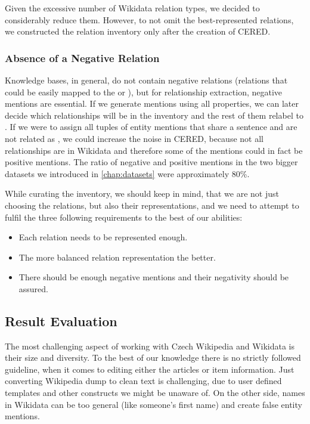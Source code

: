 Given the excessive number of Wikidata relation types, we decided to considerably reduce them. However, to not omit the best-represented relations, we constructed the relation inventory only after the creation of CERED.


\subsubsection{Absence of a Negative Relation}Knowledge bases, in general, do not contain negative relations (relations that could be easily mapped to the  or ), but for relationship extraction, negative mentions are essential. If we generate mentions using all properties, we can later decide which relationships will be in the inventory and the rest of them relabel to . If we were to assign all tuples of entity mentions that share a sentence and are not related as , we could increase the noise in CERED, because not all relationships are in Wikidata and therefore some of the  mentions could in fact be positive mentions. The ratio of negative and positive mentions in the two bigger datasets we introduced in \autoref{chap:datasets} were approximately 80\%.

While curating the inventory, we should keep in mind, that we are not just choosing the relations, but also their representations, and we need to attempt to fulfil the three following requirements to the best of our abilities:
\begin{itemize}
\item Each relation needs to be represented enough.
\item The more balanced relation representation the better.
\item There should be enough negative mentions and their negativity should be assured.

\end{itemize}

\subsection{Result Evaluation}
\label{sec:analyzaevaluace}
The most challenging aspect of working with Czech Wikipedia and Wikidata is their size and diversity. To the best of our knowledge there is no strictly followed guideline, when it comes to editing either the articles or item information. Just converting Wikipedia dump to clean text is challenging, due to user defined templates and other constructs we might be unaware of. On the other side, names in Wikidata can be too general (like someone's first name) and create false entity mentions. 

